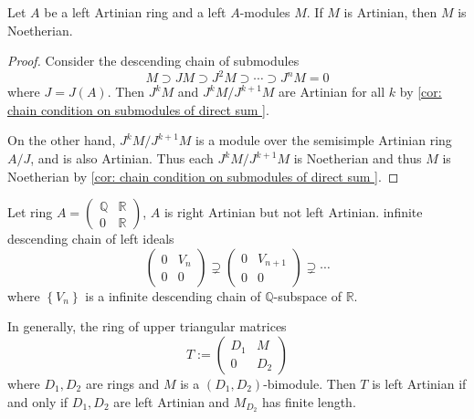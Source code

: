\begin{theorem}
    \label{thm:Hopkins-Levitzki}
    Let $A$ be a left Artinian ring and a left $A$-modules $M$.
    If $M$ is Artinian, then $M$ is Noetherian.
    \begin{proof}
        Consider the descending chain of submodules
        \begin{equation*}
            M \supset J M \supset J^2 M \supset \cdots \supset J^n M =0
        \end{equation*}
        where $J=J(A)$.
        Then $J^kM$ and $J^k M / J^{k+1} M$ are Artinian for all $k$ by \ref{cor: chain condition on submodules of direct sum }.

        On the other hand, $J^k M / J^{k+1} M$ is a module over the semisimple Artinian ring $A / J$, and is also Artinian. Thus each $J^k M / J^{k+1} M$ is Noetherian and thus $M$ is Noetherian by \ref{cor: chain condition on submodules of direct sum }.
    \end{proof}
\end{theorem}

\begin{example}
    Let ring $A=\left(\begin{matrix}
                \mathbb{Q} & \mathbb{R} \\
                0          & \mathbb{R}
            \end{matrix}\right)$, $A$ is right Artinian but not left Artinian.
    infinite descending chain of left ideals
    \begin{equation*}
        \left(\begin{matrix}
            0 & V_n \\
            0 & 0
        \end{matrix}\right) \supsetneq \left(\begin{matrix}
            0 & V_{n+1} \\
            0 & 0
        \end{matrix}\right) \supsetneq \cdots
    \end{equation*}
    where $\left\{V_n\right\}$ is a infinite descending chain of $\mathbb{Q}$-subspace of $\mathbb{R}$.

    In generally, the ring of upper triangular matrices
    \begin{equation*}
        T
        :=
        \left(\begin{matrix}
            D_1 & M   \\
            0   & D_2
        \end{matrix}\right)
    \end{equation*}
    where $D_1,D_2$ are rings and $M$ is a $\left(D_1,D_2\right)$-bimodule.
    Then $T$ is left Artinian if and only if $D_1,D_2$ are left Artinian and $M_{D_2}$ has finite length.

\end{example}


